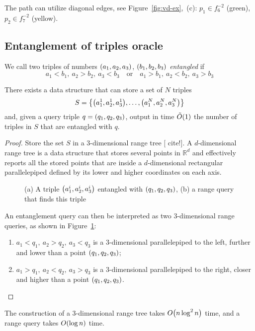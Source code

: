 \documentclass[a4paper,11pt]{article}
\begin{document}
The path can utilize diagonal edges, see Figure~\ref{fig:vd-ex},~(c): \(p_1 \in f_6^{-2}\) (green), \(p_2 \in f_7^{-2}\) (yellow).


\subsection{Entanglement of triples oracle}

\begin{definition}
	We call two triples of numbers \(\lr*{a_1, a_2, a_3}\),
	\(\lr*{b_1, b_2, b_3}\) \emph{entangled} if
	\[ a_1 < b_1,\ a_2 > b_2,\ a_3 < b_3\quad\text{or}\quad
	   a_1 > b_1,\ a_2 < b_2,\ a_3 > b_3\]
\end{definition}

\begin{theorem}
	There exists a data structure that can store a set of \(N\) triples
	\[S = \set*{\lr*{a^1_1, a^1_2, a^1_3}, \ldots, \lr*{a^N_1, a^N_2, a^N_3}}\]
	and, given a query triple \(q = \lr*{q_1, q_2, q_3}\), output
	in time \(\Ot\lr*{1}\)  %
	the number of triples in \(S\) that are entangled with \(q\).
\end{theorem}

\begin{proof}
	Store the set \(S\) in a 3-dimensional range tree [{\color{magenta} cite!}].
	A \(d\)-dimensional range tree is a data structure that stores several points
	in \(\mathbb{R}^d\) and effectively reports all the stored points that are
	inside a \(d\)-dimensional rectangular parallelepiped defined by
	its lower and higher coordinates on each axis.

\begin{figure}[ht] \centering
	

	\caption{(a) A triple \(\lr*{a^i_1, a^i_2, a^i_3}\) entangled
	with \(\lr*{q_1, q_2, q_3}\),
	         (b) a range query that finds this triple}
	\label{fig:paral-trans}
\end{figure}

	An entanglement query can then be interpreted as two 3-dimensional range
	queries, as shown in Figure~\ref{fig:paral-trans}:
   \begin{enumerate}
	\item \(a_1 < q_1,\ a_2 > q_2,\ a_3 < q_3\) is a 3-dimensional parallelepiped
	  to the left, further and lower than a point \(\lr*{q_1, q_2, q_3}\);
	\item \(a_1 > q_1,\ a_2 < q_2,\ a_3 > q_3\) is a 3-dimensional parallelepiped
	  to the right, closer and higher than a point \(\lr*{q_1, q_2, q_3}\).
   \end{enumerate}
\end{proof}

\begin{remark}
	The construction of a 3-dimensional range tree takes \(O \lr*{n \log^2 n}\) time,
	and a range query takes \(O \lr*{\log n}\) time.
\end{remark}


%
\end{document}
